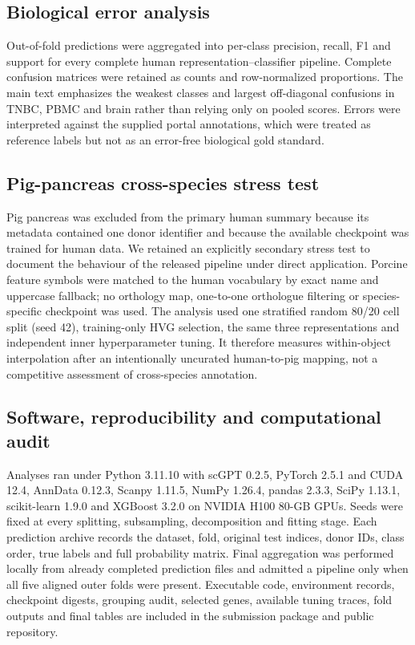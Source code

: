 \subsection{Biological error analysis}

Out-of-fold predictions were aggregated into per-class precision, recall, F1 and support for every complete human representation--classifier pipeline. Complete confusion matrices were retained as counts and row-normalized proportions. The main text emphasizes the weakest classes and largest off-diagonal confusions in TNBC, PBMC and brain rather than relying only on pooled scores. Errors were interpreted against the supplied portal annotations, which were treated as reference labels but not as an error-free biological gold standard.

\subsection{Pig-pancreas cross-species stress test}

Pig pancreas was excluded from the primary human summary because its metadata contained one donor identifier and because the available checkpoint was trained for human data. We retained an explicitly secondary stress test to document the behaviour of the released pipeline under direct application. Porcine feature symbols were matched to the human vocabulary by exact name and uppercase fallback; no orthology map, one-to-one orthologue filtering or species-specific checkpoint was used. The analysis used one stratified random 80/20 cell split (seed 42), training-only HVG selection, the same three representations and independent inner hyperparameter tuning. It therefore measures within-object interpolation after an intentionally uncurated human-to-pig mapping, not a competitive assessment of cross-species annotation.

\subsection{Software, reproducibility and computational audit}

Analyses ran under Python 3.11.10 with scGPT 0.2.5, PyTorch 2.5.1 and CUDA 12.4, AnnData 0.12.3, Scanpy 1.11.5, NumPy 1.26.4, pandas 2.3.3, SciPy 1.13.1, scikit-learn 1.9.0 \citep{Pedregosa2011} and XGBoost 3.2.0 on NVIDIA H100 80-GB GPUs. Seeds were fixed at every splitting, subsampling, decomposition and fitting stage. Each prediction archive records the dataset, fold, original test indices, donor IDs, class order, true labels and full probability matrix. Final aggregation was performed locally from already completed prediction files and admitted a pipeline only when all five aligned outer folds were present. Executable code, environment records, checkpoint digests, grouping audit, selected genes, available tuning traces, fold outputs and final tables are included in the submission package and public repository.
